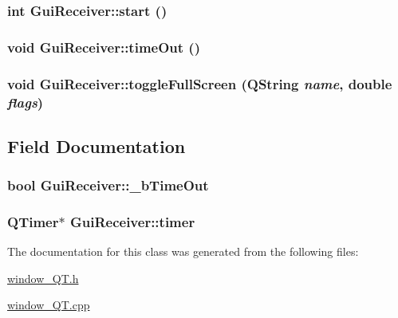 \hypertarget{classGuiReceiver_a4f0ca1781d324a9b658b01034895e1ee}{
\subsubsection[{start}]{\setlength{\rightskip}{0pt plus 5cm}int GuiReceiver::start ()}}
\label{classGuiReceiver_a4f0ca1781d324a9b658b01034895e1ee}
\hypertarget{classGuiReceiver_aa8aab548c6a8fb1463c6cc7eb133ce7c}{
\subsubsection[{timeOut}]{\setlength{\rightskip}{0pt plus 5cm}void GuiReceiver::timeOut ()}}
\label{classGuiReceiver_aa8aab548c6a8fb1463c6cc7eb133ce7c}
\hypertarget{classGuiReceiver_a50571c44603479d7d96426b1de23b010}{
\subsubsection[{toggleFullScreen}]{\setlength{\rightskip}{0pt plus 5cm}void GuiReceiver::toggleFullScreen (QString {\em name}, \/  double {\em flags})}}
\label{classGuiReceiver_a50571c44603479d7d96426b1de23b010}


\subsection{Field Documentation}
\hypertarget{classGuiReceiver_ad2d629b90a37e814db074e7ba1fc1aa9}{
\subsubsection[{\_\-bTimeOut}]{\setlength{\rightskip}{0pt plus 5cm}bool {\bf GuiReceiver::\_\-bTimeOut}}}
\label{classGuiReceiver_ad2d629b90a37e814db074e7ba1fc1aa9}
\hypertarget{classGuiReceiver_aeb64966586c4a35cfc02db46491afdf6}{
\subsubsection[{timer}]{\setlength{\rightskip}{0pt plus 5cm}QTimer$\ast$ {\bf GuiReceiver::timer}}}
\label{classGuiReceiver_aeb64966586c4a35cfc02db46491afdf6}


The documentation for this class was generated from the following files:\begin{DoxyCompactItemize}
\item 
\hyperlink{window__QT_8h}{window\_\-QT.h}\item 
\hyperlink{window__QT_8cpp}{window\_\-QT.cpp}\end{DoxyCompactItemize}
